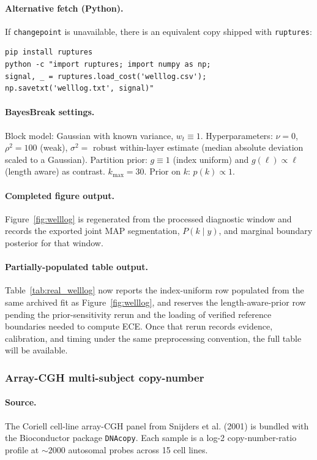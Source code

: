\paragraph{Alternative fetch (Python).}
If \texttt{changepoint} is unavailable, there is an equivalent copy shipped with \texttt{ruptures}:
\begin{verbatim}
pip install ruptures
python -c "import ruptures; import numpy as np;
signal, _ = ruptures.load_cost('welllog.csv');
np.savetxt('welllog.txt', signal)"
\end{verbatim}

\paragraph{BayesBreak settings.}
Block model: Gaussian with known variance, $w_t\equiv 1$. Hyperparameters: $\nu=0$,
$\rho^2=100$ (weak), $\sigma^2=$ robust within-layer estimate (median absolute deviation scaled to
a Gaussian). Partition prior: $g\equiv 1$ (index uniform) and $g(\ell)\propto\ell$ (length
aware) as contrast. $k_{\max}=30$. Prior on $k$: $p(k)\propto 1$.

\paragraph{Completed figure output.}
Figure~\ref{fig:welllog} is regenerated from the processed diagnostic window and records the exported joint MAP segmentation, $P(k\mid y)$, and marginal boundary posterior for that window.

\paragraph{Partially-populated table output.}
Table~\ref{tab:real_welllog} now reports the index-uniform row populated from the same archived fit as Figure~\ref{fig:welllog}, and reserves the length-aware-prior row pending the prior-sensitivity rerun and the loading of verified reference boundaries needed to compute ECE. Once that rerun records evidence, calibration, and timing under the same preprocessing convention, the full table will be available.

\subsubsection{Array-CGH multi-subject copy-number}
\label{app:real-data-cgh}

\paragraph{Source.}
The Coriell cell-line array-CGH panel from Snijders et al. (2001) is bundled with the
Bioconductor package \texttt{DNAcopy}. Each sample is a log-2 copy-number-ratio profile at
$\sim 2000$ autosomal probes across 15 cell lines.

